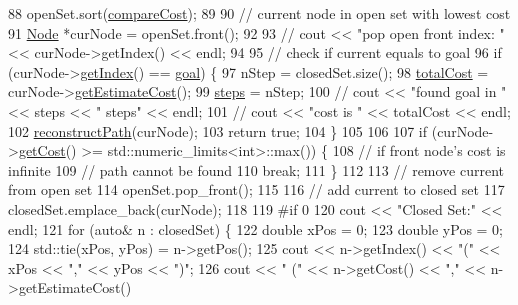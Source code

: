 \begin{DoxyCode}
88         openSet.sort(\hyperlink{AStarAlgorithm_8cpp_a9941f2d9671bce063d16ba2ecd046d6a}{compareCost});
89 
90         \textcolor{comment}{// current node in open set with lowest cost}
91         \hyperlink{classNode}{Node} *curNode = openSet.front();
92 
93         \textcolor{comment}{// cout << "pop open front index: " << curNode->getIndex() << endl;}
94 
95         \textcolor{comment}{// check if current equals to goal}
96         \textcolor{keywordflow}{if} (curNode->\hyperlink{classNode_af157df6ef5c45d7ce978e9c7371c297e}{getIndex}() == \hyperlink{classPathFindingAlgorithm_ae8acf41f92ba72a969a44640c99fb8a4}{goal}) \{
97             nStep = closedSet.size();
98             \hyperlink{classPathFindingAlgorithm_ad6a91f82618d6a7a95900b5c63337837}{totalCost} = curNode->\hyperlink{classNode_a9c7e1456a27ec44e98d75ca1d2db21f1}{getEstimateCost}();
99             \hyperlink{classPathFindingAlgorithm_aa4d442ba7d2499f61e81b8c0fabc55a5}{steps} = nStep;
100             \textcolor{comment}{// cout << "found goal in " << steps << " steps" << endl;}
101             \textcolor{comment}{// cout << "cost is " << totalCost << endl;}
102             \hyperlink{classPathFindingAlgorithm_a334c5cfc5b40a1e8458eb960ff5f541c}{reconstructPath}(curNode);
103             \textcolor{keywordflow}{return} \textcolor{keyword}{true};
104         \}
105 
106 
107         \textcolor{keywordflow}{if} (curNode->\hyperlink{classNode_a06d6bc069a40309fb4d228af02dface4}{getCost}() >= std::numeric\_limits<int>::max()) \{
108             \textcolor{comment}{// if front node's cost is infinite}
109             \textcolor{comment}{// path cannot be found}
110             \textcolor{keywordflow}{break};
111         \}
112 
113         \textcolor{comment}{// remove current from open set}
114         openSet.pop\_front();
115 
116         \textcolor{comment}{// add current to closed set}
117         closedSet.emplace\_back(curNode);
118 
119 \textcolor{preprocessor}{#if 0}
120 \textcolor{preprocessor}{}        cout << \textcolor{stringliteral}{"Closed Set:"} << endl;
121         \textcolor{keywordflow}{for} (\textcolor{keyword}{auto}& n : closedSet) \{
122             \textcolor{keywordtype}{double} xPos = 0;
123             \textcolor{keywordtype}{double} yPos = 0;
124             std::tie(xPos, yPos) = n->getPos();
125             cout << n->getIndex() << \textcolor{stringliteral}{"("} << xPos << \textcolor{stringliteral}{","} << yPos << \textcolor{stringliteral}{")"};
126             cout << \textcolor{stringliteral}{" ("} << n->getCost() << \textcolor{stringliteral}{","} << n->getEstimateCost()

\end{DoxyCode}
